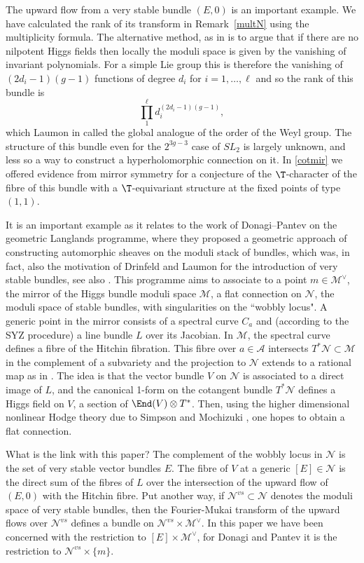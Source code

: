The upward flow from a very stable bundle $(E,0)$ is an important example.
We have calculated the rank of its transform in Remark~\ref{multN} using the multiplicity formula. The alternative method, as in \cite{beauville-etal} is to argue
that if there are no nilpotent Higgs fields then locally the moduli space is given by the vanishing of invariant polynomials. For a simple Lie group this is therefore the vanishing of  $(2d_i-1)(g-1)$ functions of degree $d_i$ for $i=1,\dots,\ell$ and so the rank of this bundle is
$$\prod_1^{\ell}d_i^{(2d_i-1)(g-1)},$$  which Laumon in \cite[Remark 6.2.3]{laumon2} called the global analogue of the order of the Weyl group.
The structure of this bundle even for the $2^{3g-3}$ case of $SL_2$ is largely unknown, and less so a way to construct a hyperholomorphic connection on it.  In \eqref{cotmir}  we offered evidence from mirror symmetry for a conjecture of the $\T$-character of the  fibre of this bundle with a $\T$-equivariant structure at the fixed points of type $(1,1)$.

It is an important example as  it relates to the work of Donagi--Pantev \cite{DP} on the
geometric Langlands programme, where they proposed a geometric approach of constructing automorphic sheaves on the moduli stack of bundles, which was, in fact, also the motivation of  Drinfeld \cite{drinfeld} and Laumon \cite{laumon} for the introduction of very stable bundles, see also \cite[Conjecture 6.2.1]{laumon2}. This programme aims to associate to a point  $m\in {\mathcal M}^{\vee}$, the mirror of the Higgs bundle moduli space ${\mathcal M}$, a flat connection on ${\mathcal N}$, the moduli space of stable bundles, with singularities on the ``wobbly locus". A generic point in the mirror consists of a spectral curve $C_a$ and (according to the SYZ procedure) a line bundle $L$ over its Jacobian. In ${\mathcal M}$, the spectral curve defines a fibre of the Hitchin fibration. This fibre over $a\in {\mathcal A}$ intersects $T^*{\mathcal N}\subset {\mathcal M}$ in the complement of a subvariety and the projection to ${\mathcal N}$ extends to a rational map as in \cite{beauville-etal}. The idea is that the vector bundle $V$ on ${\mathcal N}$ is associated to a direct image of $L$, and the canonical
1-form on the cotangent bundle $T^*{\mathcal N}$ defines a Higgs field on $V$, a section of $\End (V)\otimes T^*$. Then, using the higher dimensional nonlinear Hodge theory due to Simpson and  Mochizuki \cite{mochizuki}, one hopes to obtain a flat connection.

What is the link with this paper? The complement of the wobbly locus in ${\mathcal N}$ is the set of very stable vector bundles $E$. The fibre of $V$  at a generic $[E]\in {\mathcal N}$ is the direct sum of the fibres of $L$ over the intersection of the upward flow of $(E,0)$ with the Hitchin fibre. Put another way, if ${\mathcal N}^{vs}\subset {\mathcal N}$ denotes the moduli space of very stable bundles, then the Fourier-Mukai transform of the upward flows over  ${\mathcal N}^{vs}$
defines a bundle on ${\mathcal N}^{vs}\times {\mathcal M}^{\vee}$. In this paper we have been concerned with the restriction to $[E]\times {\mathcal M}^{\vee}$, for Donagi and Pantev it is the restriction to ${\mathcal N}^{vs}\times \{m\}$.

